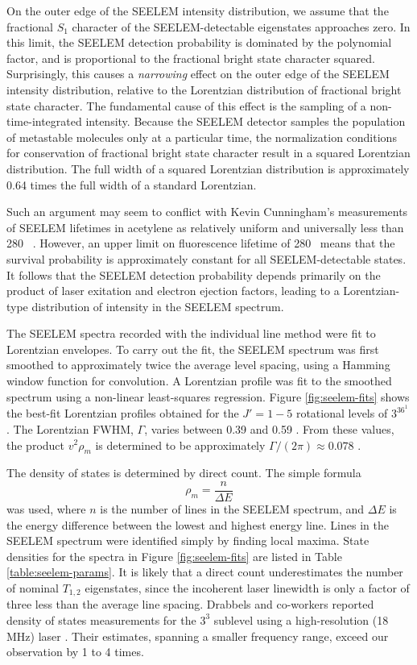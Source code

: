 \documentclass[12pt]{mitthesis}
\begin{document}
On the outer edge of the SEELEM intensity distribution, we assume that
the fractional $S_1$ character of the SEELEM-detectable eigenstates
approaches zero.  In this limit, the SEELEM detection probability is
dominated by the polynomial factor, and is proportional to the
fractional bright state character squared.  Surprisingly, this causes
a \emph{narrowing} effect on the outer edge of the SEELEM intensity
distribution, relative to the Lorentzian distribution of fractional
bright state character.  The fundamental cause of this effect is the
sampling of a non-time-integrated intensity.  Because the SEELEM
detector samples the population of metastable molecules only at a
particular time, the normalization conditions for conservation of
fractional bright state character result in a squared Lorentzian
distribution.  The full width of a squared Lorentzian distribution is
approximately 0.64 times the full width of a standard Lorentzian.

Such an argument may seem to conflict with Kevin Cunningham's
measurements of SEELEM lifetimes in acetylene as relatively uniform
and universally less than 280 \microsec\ \cite{cunningham-thesis}.
However, an upper limit on fluorescence lifetime of 280 \microsec\
means that the survival probability is approximately constant for all
SEELEM-detectable states.  It follows that the SEELEM detection
probability depends primarily on the product of laser exitation and
electron ejection factors, leading to a Lorentzian-type distribution
of intensity in the SEELEM spectrum.

The SEELEM spectra recorded with the individual line method were fit to
Lorentzian envelopes.  To carry out the fit, the SEELEM spectrum was
first smoothed to approximately twice the average level spacing, using
a Hamming window function for convolution.  A Lorentzian profile was
fit to the smoothed spectrum using a non-linear least-squares
regression.  Figure \ref{fig:seelem-fits} shows the best-fit
Lorentzian profiles obtained for the $J'=1-5$ rotational levels of
$3^36^1$ \Ka{0}.  The Lorentzian FWHM, $\Gamma$, varies between 0.39 and
0.59 \rcm.  From these values, the product $v^2 \rho_m$ is determined
to be approximately $\Gamma / (2 \pi) \approx 0.078$ \rcm.  

The density of states is determined by direct count.  The simple
formula
\begin{equation}
\rho_m = \frac{n}{\Delta E}
\end{equation}
was used, where $n$ is the number of lines in the SEELEM spectrum, and
$\Delta E$ is the energy difference between the lowest and highest
energy line.  Lines in the SEELEM spectrum were identified simply by
finding local maxima.  State densities for the spectra in Figure
\ref{fig:seelem-fits} are listed in Table \ref{table:seelem-params}.
It is likely that a direct count underestimates the number of nominal
$T_{1,2}$ eigenstates, since the incoherent laser linewidth is only a
factor of three less than the average line spacing.  Drabbels and
co-workers reported density of states measurements for the $3^3$
\Ka{1} sublevel using a high-resolution (18 MHz) laser
\cite{drabbels94}.  Their estimates, spanning a smaller frequency
range, exceed our observation by 1 to 4 times.
\end{document}
